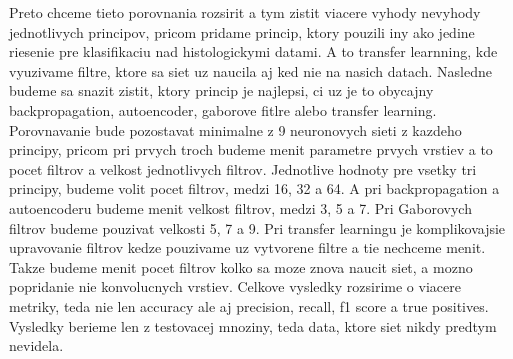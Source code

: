 \documentclass[runningheads]{llncs}
\begin{document}
Preto chceme tieto porovnania rozsirit a tym zistit viacere vyhody nevyhody jednotlivych principov, pricom pridame princip, ktory pouzili iny ako jedine riesenie pre klasifikaciu nad histologickymi datami.
A to transfer learnning, kde vyuzivame filtre, ktore sa siet uz naucila aj ked nie na nasich datach.
Nasledne budeme sa snazit zistit, ktory princip je najlepsi, ci uz je to obycajny backpropagation, autoencoder, gaborove fitlre alebo transfer learning. 
Porovnavanie bude pozostavat minimalne z 9 neuronovych sieti z kazdeho principy, pricom pri prvych troch budeme menit parametre prvych vrstiev a to pocet filtrov a velkost jednotlivych filtrov. 
Jednotlive hodnoty pre vsetky tri principy, budeme volit pocet filtrov, medzi 16, 32 a 64. A pri backpropagation a autoencoderu budeme menit velkost filtrov, medzi 3, 5 a 7. 
Pri Gaborovych filtrov budeme pouzivat velkosti 5, 7 a 9. Pri transfer learningu je komplikovajsie upravovanie filtrov kedze pouzivame uz vytvorene filtre a tie nechceme menit.
Takze budeme menit pocet filtrov kolko sa moze znova naucit siet, a mozno popridanie nie konvolucnych vrstiev. 
Celkove vysledky rozsirime o viacere metriky, teda nie len accuracy ale aj precision, recall, f1 score a true positives. 
Vysledky berieme len z testovacej mnoziny, teda data, ktore siet nikdy predtym nevidela. 

%
%
%


\end{document}
